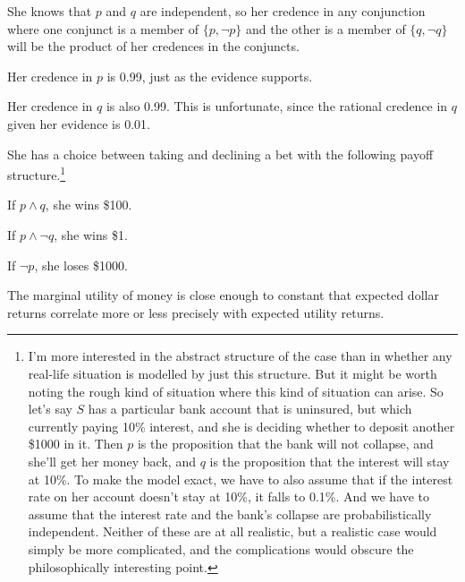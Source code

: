 \begin{itemize*}
\item She knows that \(p\) and \(q\) are independent, so her credence in any conjunction where one conjunct is a member of  \(\{p,  \neg p\}\) and the other is a member of \(\{q, \neg q\}\) will be the product of her credences in the conjuncts.
\item Her credence in \(p\) is 0.99, just as the evidence supports.
\item Her credence in \(q\) is also 0.99. This is unfortunate, since the rational credence in \(q\) given her evidence is 0.01.
\item She has a choice between taking and declining a bet with the following payoff structure.\footnote{I'm more interested in the abstract structure of the case than in whether any real-life situation is modelled by just this structure. But it might be worth noting the rough kind of situation where this kind of situation can arise. So let's say \(S\) has a particular bank account that is uninsured, but which currently paying 10\% interest, and she is deciding whether to deposit another \$1000 in it. Then \(p\) is the proposition that the bank will not collapse, and she'll get her money back, and \(q\) is the proposition that the interest will stay at 10\%. To make the model exact, we have to also assume that if the interest rate on her account doesn't stay at 10\%, it falls to 0.1\%. And we have to assume that the interest rate and the bank's collapse are probabilistically independent. Neither of these are at all realistic, but a realistic case would simply be more complicated, and the complications would obscure the philosophically interesting point.}
\begin{itemize*}
\item If \(p \wedge q\), she wins \$100.
\item If \(p \wedge \neg q\), she wins \$1.
\item If \(\neg p\), she loses \$1000.
\end{itemize*}
\item The marginal utility of money is close enough to constant that expected dollar returns correlate more or less precisely with expected utility returns.
\end{itemize*}

